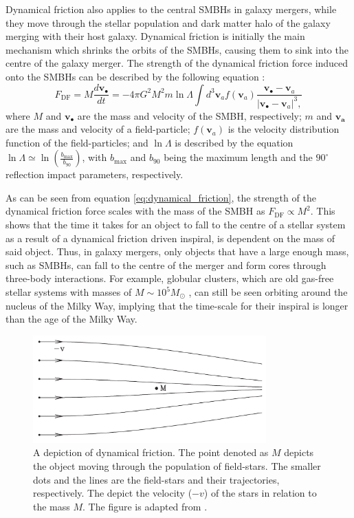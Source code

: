 \documentclass[english, oneside]{HYgradu}
\begin{document}
Dynamical friction also applies to the central SMBHs in galaxy mergers, while they move through the stellar population and dark matter halo of the galaxy merging with their host galaxy. Dynamical friction is initially the main mechanism which shrinks the orbits of the SMBHs, causing them to sink into the centre of the galaxy merger. The strength of the dynamical friction force induced onto the SMBHs can be described by the following equation \citep{BinneyTremaine}:
\begin{equation}
F_\mathrm{DF} = M\frac{d\mathbf{v_\bullet}}{dt} = -4\pi G^2 M^2 m \ln \Lambda \int d^3 \mathbf{v}_a f(\mathbf{v}_a) \frac{\mathbf{v_\bullet}-\mathbf{v}_a}{|\mathbf{v_\bullet}-\mathbf{v}_a|^3,} \label{eq:dynamical_friction}
\end{equation}
where $M$ and $\mathbf{v_\bullet}$ are the mass and velocity of the SMBH, respectively; $m$ and $\mathbf{v_a}$ are the mass and velocity of a field-particle; $f\left(\mathbf{v}_a\right)$ is the velocity distribution function of the field-particles; and $\ln \Lambda$ is described by the equation $\ln \Lambda \simeq \ln \left( \frac{b_\mathrm{max}}{b_{90}} \right)$, with $b_\mathrm{max}$ and $b_{90}$ being the maximum length and the $90^\circ$ reflection impact parameters, respectively.

As can be seen from equation \ref{eq:dynamical_friction}, the strength of the dynamical friction force scales with the mass of the SMBH as $F_\mathrm{DF} \propto M^2$. This shows that the time it takes for an object to fall to the centre of a stellar system as a result of a dynamical friction driven inspiral, is dependent on the mass of said object. Thus, in galaxy mergers, only objects that have a large enough mass, such as SMBHs, can fall to the centre of the merger and form cores through three-body interactions. For example, globular clusters, which are old gas-free stellar systems with masses of $M \sim 10^5 M_\odot$ \citep{BinneyTremaine}, can still be seen orbiting around the nucleus of the Milky Way, implying that the time-scale for their inspiral is longer than the age of the Milky Way.

\begin{figure}
	\centering
	\includegraphics[width=0.8\textwidth]{mo_dynamical_friction.png}
	\caption{A depiction of dynamical friction. The point denoted as $M$ depicts the object moving through the population of field-stars. The smaller dots and the lines are the field-stars and their trajectories, respectively. The depict the velocity ($-v$) of the stars in relation to the mass $M$. The figure is adapted from \cite{GalaxyFormationAndEvo2010}.}
	\label{figure:dynamical_friction}
\end{figure}
\end{document}
